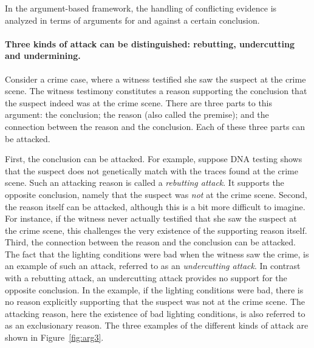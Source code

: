 \documentclass[10pt]{article}
\begin{document}
In the argument-based framework, the handling of conflicting evidence is analyzed 
in terms of arguments for and against a certain conclusion.


\paragraph{Three kinds of attack can be distinguished: rebutting, undercutting and undermining.}

Consider a crime case, where a witness testified she saw the suspect at the crime scene. The witness testimony constitutes a 
reason supporting the conclusion that the suspect indeed was at the crime scene. There are three parts to this argument: the conclusion; the reason (also called the premise); and the connection between the reason and the conclusion.
Each of these three parts can be attacked. %

First, the conclusion can be attacked. %
For example, suppose DNA testing shows that the suspect does not genetically match 
with the traces found at the crime scene. 
Such an attacking reason is called a \textit{rebutting attack}.  
It supports the opposite conclusion, namely that the suspect was \textit{not} 
at the crime scene. 
%
Second, the reason itself can be attacked, although this is a bit more difficult to imagine.  
 For instance, %
 if the witness never actually testified that she saw the suspect at the crime scene, this challenges the very 
 existence of the supporting reason itself. 
%
Third, the connection between the reason and the conclusion can be attacked.
 The fact that the lighting conditions were bad when the witness saw the crime, 
 is an example of such an attack, referred to as an \textit{undercutting attack}.
 In contrast with a rebutting attack, an undercutting attack provides no support for the opposite conclusion. In the example, %
 if the lighting conditions were bad, there is no reason explicitly 
 supporting that the suspect was not at the crime scene. The attacking reason, %
 here the existence of bad lighting conditions, is also referred to as an exclusionary reason. 
%
The three examples of the different kinds of attack are shown in Figure~\ref{fig:arg3}.
\end{document}
